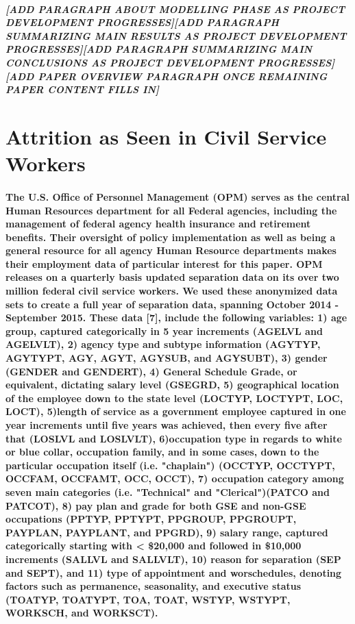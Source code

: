 \documentclass{article}
\begin{document}
\subparagraph{[ADD PARAGRAPH ABOUT MODELLING PHASE AS PROJECT DEVELOPMENT PROGRESSES][ADD PARAGRAPH SUMMARIZING MAIN RESULTS AS PROJECT DEVELOPMENT PROGRESSES][ADD PARAGRAPH SUMMARIZING MAIN CONCLUSIONS AS PROJECT DEVELOPMENT PROGRESSES][ADD PAPER OVERVIEW PARAGRAPH ONCE REMAINING PAPER CONTENT FILLS IN]}
  
\section{Attrition as Seen in Civil Service Workers}

\paragraph{The U.S. Office of Personnel Management (OPM) serves as the central Human Resources department for all Federal agencies, including the management of federal agency health insurance and retirement benefits. Their oversight of policy implementation as well as being a general resource for all agency Human Resource departments makes their employment data of particular interest for this paper. OPM releases on a quarterly basis updated separation data on its over two million federal civil service workers.  We used these anonymized data sets to create a full year of separation data, spanning October 2014 - September 2015.   These data [7], include the following variables: 1) age group, captured categorically in 5 year increments (AGELVL and AGELVLT), 2) agency type and subtype information (AGYTYP, AGYTYPT, AGY, AGYT, AGYSUB, and AGYSUBT), 3) gender (GENDER and GENDERT), 4) General Schedule Grade, or equivalent, dictating salary level (GSEGRD, 5) geographical location of the employee down to the state level (LOCTYP, LOCTYPT, LOC, LOCT), 5)length of service as a government employee captured in one year increments until five years was achieved, then every five after that (LOSLVL and LOSLVLT), 6)occupation type  in regards to white or blue collar, occupation family, and in some cases, down to the particular occupation itself (i.e. "chaplain") (OCCTYP, OCCTYPT, OCCFAM, OCCFAMT, OCC, OCCT), 7) occupation category among seven main categories (i.e. "Technical" and "Clerical")(PATCO and PATCOT), 8) pay plan and grade for both GSE and non-GSE occupations (PPTYP, PPTYPT, PPGROUP, PPGROUPT, PAYPLAN, PAYPLANT, and PPGRD), 9) salary range, captured categorically starting with < \$20,000 and followed in \$10,000 increments (SALLVL and SALLVLT), 10) reason for separation (SEP and SEPT), and 11) type of appointment and worschedules, denoting factors such as permanence, seasonality, and executive status (TOATYP, TOATYPT, TOA, TOAT, WSTYP, WSTYPT, WORKSCH, and WORKSCT).   }
\end{document}
